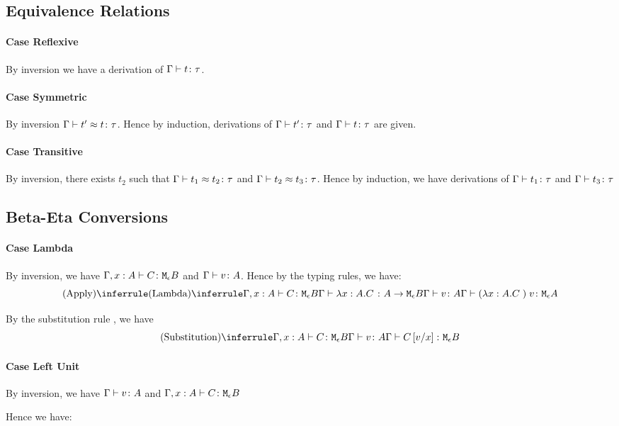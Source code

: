 {\subsection{Equivalence Relations}
\paragraph{Case Reflexive}
By inversion we have a derivation of $\Gamma \vdash t \colon \tau$.

\paragraph{Case Symmetric}
By inversion $\Gamma \vdash t' \approx t \colon \tau$. Hence by induction, derivations of $\Gamma \vdash t' \colon \tau$ and $\Gamma \vdash t \colon \tau$ are given.

\paragraph{Case Transitive}
By inversion, there exists $t_2$ such that $\Gamma \vdash t_1 \approx t_2 \colon \tau$ and $\Gamma \vdash t_2 \approx t_3 \colon \tau$.
Hence by induction, we have derivations of $\Gamma \vdash t_1 \colon \tau$ and $\Gamma \vdash t_3 \colon \tau$

\subsection{Beta-Eta Conversions}

\paragraph{Case Lambda}
    By inversion, we have $\Gamma, x: A \vdash C \colon \texttt{M}_{\epsilon}{B}$ and $\Gamma \vdash v \colon A$. Hence by the typing rules, we have:
    $$\ntreeruleII{Apply}{
        \ntreeruleI{Lambda}{\typerelation{\gax }{C}{\meb}}{\gtyperelation{\lam{x}{A}{C}}{\aeb}}
    }{
        \gtyperelation{v}{A}
    }{\gtyperelation{\apply{(\lam{x}{A}{C})}{v}}{\mea}}$$

    By the substitution rule , we have 
    $$\ntreeruleII{Substitution}{\typerelation{\gax}{C}{\meb}}{\gtyperelation{v}{A}}{\gtyperelation{C\ssub{x}{v}}{\meb}}$$
    \paragraph{Case Left Unit}
    By inversion, we have $\Gamma \vdash v \colon A$ and $\Gamma, x: A  \vdash C \colon \texttt{M}_{\epsilon}{B}$

    Hence we have:


}
